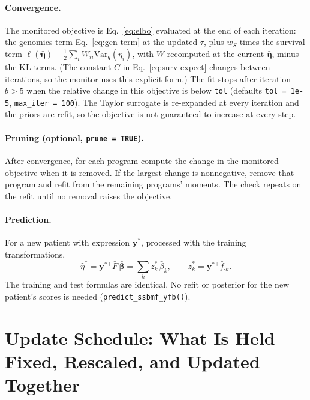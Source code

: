 \documentclass[11pt]{article}
\newcommand{\fbar}[2]{\bar{f}_{#1#2}}
\newcommand{\betabar}[1]{\bar{\beta}_{#1}}
\newcommand{\Var}{\mathrm{Var}_q}
\newcommand{\ws}{w_S}
\begin{document}
\paragraph{Convergence.} The monitored objective is Eq.~\eqref{eq:elbo} evaluated
at the end of each iteration: the genomics term Eq.~\eqref{eq:gen-term} at the
updated $\tau$, plus $\ws$ times the survival term
$\ell(\bar{\bm\eta}) - \tfrac12\sum_iW_{ii}\Var(\eta_i)$, with $W$ recomputed at the
current $\bar{\bm\eta}$, minus the KL terms. (The constant $C$ in
Eq.~\eqref{eq:surv-expect} changes between iterations, so the monitor uses this
explicit form.) The fit stops
after iteration $b > 5$ when the relative change in this objective is below
\texttt{tol} (defaults \texttt{tol = 1e-5}, \texttt{max\_iter = 100}). The Taylor surrogate is re-expanded at every iteration and the
priors are refit, so the objective is not guaranteed to increase at every step.

\paragraph{Pruning (optional, \texttt{prune = TRUE}).} After convergence, for each
program compute the change in the monitored objective when it is removed. If the
largest change is nonnegative, remove that program and refit from the remaining
programs' moments. The check repeats on the refit until no removal raises the
objective.

\paragraph{Prediction.} For a new patient with expression $\bm y^*$, processed with
the training transformations,
\begin{equation}\label{eq:predict}
  \hat\eta^* = \bm y^{*\top}\bar F\,\bar{\bm\beta} = \sum_k \bar z^*_k\,\betabar{k},
  \qquad \bar z^*_k = \bm y^{*\top}\fbar{\cdot}{k}.
\end{equation}
The training and test formulas are identical. No refit or posterior for the new
patient's scores is needed (\texttt{predict\_ssbmf\_yfb()}).

\section{Update Schedule: What Is Held Fixed, Rescaled, and Updated Together}\label{sec:schedule}
\end{document}

